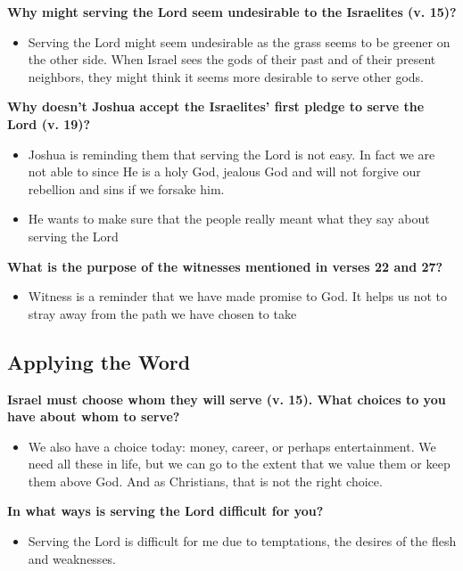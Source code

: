 \documentclass[11pt]{article}
\begin{document}
\textbf{\textbf{Why might serving the Lord seem undesirable to the Israelites (v. 15)?}}
\begin{itemize}
\item Serving the Lord might seem undesirable as the grass seems to be
greener on the other side. When Israel sees the gods of their past
and of their present neighbors, they might think it seems more
desirable to serve other gods.
\end{itemize}

\textbf{\textbf{Why doesn't Joshua accept the Israelites' first pledge to serve the Lord (v. 19)?}}
\begin{itemize}
\item Joshua is reminding them that serving the Lord is not easy. In fact
we are not able to since He is a holy God, jealous God and will not
forgive our rebellion and sins if we forsake him.
\item He wants to make sure that the people really meant what they say
about serving the Lord
\end{itemize}


\textbf{\textbf{What is the purpose of the witnesses mentioned in verses 22 and 27?}}
\begin{itemize}
\item Witness is a reminder that we have made promise to God. It helps us
not to stray away from the path we have chosen to take
\end{itemize}

\subsection{Applying the Word}
\label{sec:orgd1e5be9}

\textbf{\textbf{Israel must choose whom they will serve (v. 15). What choices to you have about whom to serve?}}
\begin{itemize}
\item We also have a choice today: money, career, or perhaps
entertainment. We need all these in life, but we can go to the
extent that we value them or keep them above God. And as Christians,
that is not the right choice.
\end{itemize}

\textbf{\textbf{In what ways is serving the Lord difficult for you?}}
\begin{itemize}
\item Serving the Lord is difficult for me due to temptations, the desires
of the flesh and weaknesses.
\end{itemize}
\end{document}
